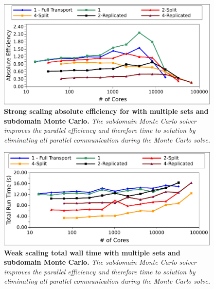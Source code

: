 \begin{figure}[t!]
  \begin{center}
    \includegraphics[width=6in]{chapters/parallel_mc/titan_strong_subdomain_ms.pdf}
  \end{center}
  \caption{\textbf{Strong scaling absolute efficiency for with
      multiple sets and subdomain Monte Carlo.} \textit{The subdomain
      Monte Carlo solver improves the parallel efficiency and
      therefore time to solution by eliminating all parallel
      communication during the Monte Carlo solve.}}
  \label{fig:titan_strong_subdomain_ms}
\end{figure}

\begin{figure}[t!]
  \begin{center}
    \includegraphics[width=6in]{chapters/parallel_mc/titan_weak_subdomain_ms_time.pdf}
  \end{center}
  \caption{\textbf{Weak scaling total wall time with multiple sets
      and subdomain Monte Carlo.} \textit{The subdomain Monte Carlo
      solver improves the parallel efficiency and therefore time to
      solution by eliminating all parallel communication during the
      Monte Carlo solve.}}
  \label{fig:titan_weak_subdomain_ms_time}
\end{figure}

